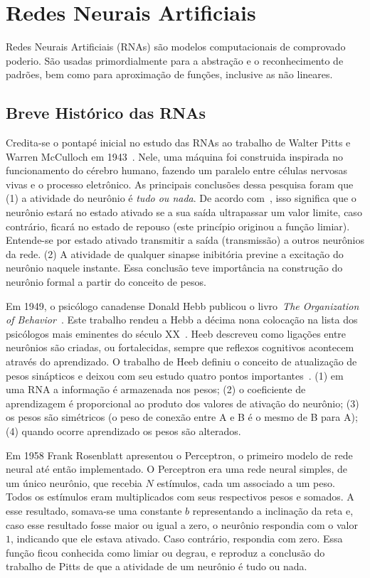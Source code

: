 \chapter{Redes Neurais Artificiais}
\label{Cap:RedesNeurais}

Redes Neurais Artificiais (RNAs) são modelos computacionais de comprovado poderio. São usadas primordialmente para a abstração e o reconhecimento de padrões, bem como para aproximação de funções, inclusive as não lineares.

\section{Breve Histórico das RNAs}

Credita-se o pontapé inicial no estudo das RNAs ao trabalho de Walter Pitts e Warren McCulloch em 1943~\citep{McCulloch1943}. Nele, uma máquina foi construida inspirada no funcionamento do cérebro humano, fazendo um paralelo entre células nervosas vivas e o processo eletrônico. As principais conclusões dessa pesquisa foram que (1) a atividade do neurônio é \emph{tudo ou nada}. De acordo com~\citep{Cardon1994}, isso significa que o neurônio estará no estado ativado se a sua saída ultrapassar um valor limite, caso contrário, ficará no estado de repouso (este princípio originou a função limiar). Entende-se por estado ativado transmitir a saída (transmissão) a outros neurônios da rede. (2) A atividade de qualquer sinapse inibitória previne a excitação do neurônio naquele instante. Essa conclusão teve importância na construção do neurônio formal a partir do conceito de pesos.

Em 1949, o psicólogo canadense Donald Hebb publicou o livro~\emph{The Organization of Behavior}~\citep{Hebb1949}. Este trabalho rendeu a Hebb a décima nona colocação na lista dos psicólogos mais eminentes do século XX~\citep{Haggbloom2002}. Heeb descreveu como ligações entre neurônios são criadas, ou fortalecidas, sempre que reflexos cognitivos acontecem através do aprendizado. O trabalho de Heeb definiu o conceito de atualização de pesos sinápticos e deixou com seu estudo quatro pontos importantes~\citep{Eberhart19909}. (1) em uma RNA a informação é armazenada nos pesos; (2) o coeficiente de aprendizagem é proporcional ao produto dos valores de ativação do neurônio; (3) os pesos são simétricos (o peso de conexão entre A e B é o mesmo de B para A); (4) quando ocorre aprendizado os pesos são alterados.

Em 1958 Frank Rosenblatt apresentou o Perceptron, o primeiro modelo de rede neural até então implementado. O Perceptron era uma rede neural simples, de um único neurônio, que recebia $N$ estímulos, cada um associado a um peso. Todos os estímulos eram multiplicados com seus respectivos pesos e somados. A esse resultado, somava-se uma constante $b$ representando a inclinação da reta e, caso esse resultado fosse maior ou igual a zero, o neurônio respondia com o valor $1$, indicando que ele estava ativado. Caso contrário, respondia com zero. Essa função ficou conhecida como limiar ou degrau, e reproduz a conclusão do trabalho de Pitts de que a atividade de um neurônio é tudo ou nada.

